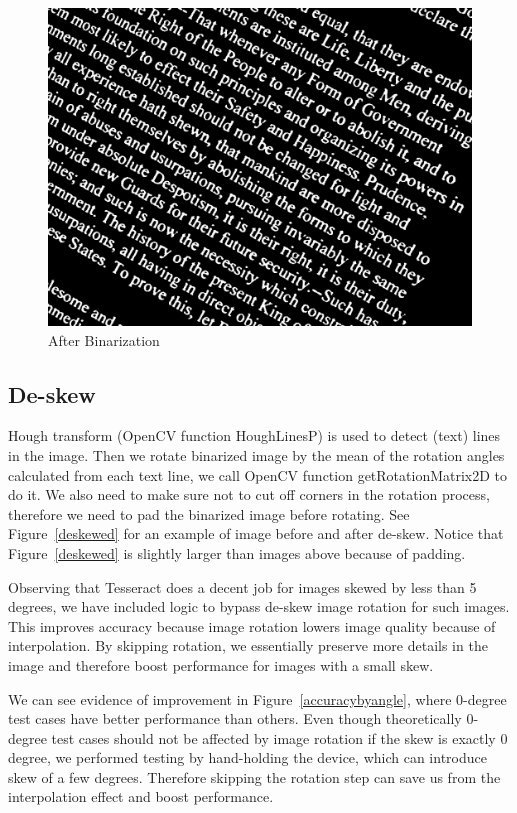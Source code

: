 \documentclass[conference]{IEEEtran}
\begin{document}
\begin{figure}
\center
\includegraphics[scale=0.15]{src_image.jpg}
\caption{After Binarization}
\label{noskewbinarized}
\end{figure}

\subsection{De-skew}

Hough transform (OpenCV function HoughLinesP) is used to detect (text) lines in the image.  Then we rotate binarized image by the mean of the rotation angles calculated from each text line, we call OpenCV function getRotationMatrix2D to do it.  We also need to make sure not to cut off corners in the rotation process, therefore we need to pad the binarized image before rotating.  See Figure~\ref{deskewed} for an example of image before and after de-skew.  Notice that Figure~\ref{deskewed} is slightly larger than images above because of padding.

Observing that Tesseract does a decent job for images skewed by less than 5 degrees, we have included logic to bypass de-skew image rotation for such images.  This improves accuracy because image rotation lowers image quality because of interpolation.  By skipping rotation, we essentially preserve more details in the image and therefore boost performance for images with a small skew.

We can see evidence of improvement in Figure~\ref{accuracybyangle}, where 0-degree test cases have better performance than others.  Even though theoretically 0-degree test cases should not be affected by image rotation if the skew is exactly 0 degree, we performed testing by hand-holding the device, which can introduce skew of a few degrees.  Therefore skipping the rotation step can save us from the interpolation effect and boost performance.
\end{document}
